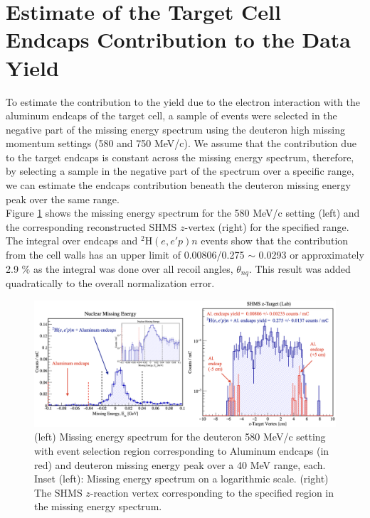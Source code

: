 \documentclass[aps, prl]{revtex4-2}  %
\begin{document}
\section{\large Estimate of the Target Cell Endcaps Contribution to the Data Yield}
\indent To estimate the contribution to the yield due to the electron interaction with the aluminum endcaps of the target cell,
a sample of events were selected in the negative part of the missing energy spectrum using the deuteron high missing momentum settings (580 and 750 MeV/c).
We assume that the contribution due to the target endcaps is constant across the missing energy spectrum, therefore, by selecting a sample in the
negative part of the spectrum over a specific range, we can estimate the endcaps contribution beneath the deuteron missing energy peak over the same range.\\
\indent Figure \ref{fig:tgt_wall} shows the missing energy spectrum for the 580 MeV/c setting (left) and the corresponding reconstructed SHMS $z$-vertex (right) for the specified
range. The integral over endcaps and $^{2}\mathrm{H}(e,e'p)n$ events show that the contribution from the cell walls has an upper limit of 0.00806/0.275 $\sim$ 0.0293 or approximately 2.9 $\%$
as the integral was done over all recoil angles, $\theta_{nq}$. This result was added quadratically to the overall normalization error.
\begin{figure}[!h]
\includegraphics[scale=0.33]{plots/tgt_bkg_d2_pm580_allthnq.png}
\caption{(left) Missing energy spectrum for the deuteron 580 MeV/c setting with event selection region corresponding to Aluminum endcaps (in red) and deuteron missing energy peak over
  a 40 MeV range, each.  Inset (left): Missing energy spectrum on a logarithmic scale. (right) The SHMS $z$-reaction vertex corresponding to
  the specified region in the missing energy spectrum.}
\label{fig:tgt_wall}
\end{figure}
\end{document}
